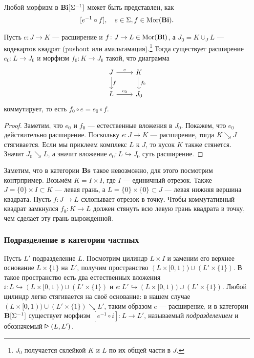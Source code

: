 \documentclass[10pt, twoside]{article}
\begin{document}
\begin{proposition}
    Любой морфизм в $\mathbf{Bi}[\Sigma^{-1}]$ может быть представлен, как $$[e^{-1}\circ f], \quad e \in \Sigma, f \in \operatorname{Mor}(\mathbf{Bi}).$$
\end{proposition}

\begin{lemma}
    Пусть $e \colon J \to K$ --- расширение и $f \colon J \to L \in \operatorname{Mor}(\mathbf{Bi})$, а $J_0 = K \cup_{J} L$ --- кодекартов квадрат (pushout или амальгамация).\footnote{$J_0$ получается склейкой $K$ и $L$ по их общей части в $J$.} Тогда существует расширение $e_0 \colon L \to J_0$ и морфизм $f_0 \colon K \to J_0$ такой, что диаграмма
    \begin{equation}
        \begin{tikzcd}
            J \rar["e"] \dar["f"] & K \dar["f_0"] \\
            L \rar["e_0"] & J_0
        \end{tikzcd}
    \end{equation}
    коммутирует, то есть $f_0 \circ e = e_0 \circ f.$
\end{lemma}
\begin{proof}
    Заметим, что $e_0$ и $f_0$ --- естественные вложения в $J_0$. Покажем, что $e_0$ действительно расширение. Поскольку $e\colon J \to K$ --- расширение, тогда $K \searrow J$ стягивается. Если мы приклеем комплекс $L$ к $J$, то  кусок $K$ также стянется. Значит $J_0 \searrow L$, а значит вложение $e_0 \colon L \hookrightarrow J_0$ суть расширение.
\end{proof}
Заметим, что в категории $\mathbf{Bs}$ такое невозможно, для этого посмотрим контрпример. Возьмём $K = I \times I$, где $I$ --- единичный отрезок. Также $J = \{0\} \times I \subset K$ --- левая грань, а $L = \{0\} \times \{0\} \subset J$ --- левая нижняя вершина квадрата. Пусть $f \colon J \to L$ схлопывает отрезок в точку. Чтобы коммутативный квадрат замкнулся $f_0 \colon K \to L$ должен стянуть всю левую грань квадрата в точку, чем сделает эту грань вырожденной.

\subsubsection{Подразделение в категории частных}
Пусть $L'$ подразделение $L$. Посмотрим цилиндр $L \times I$ и заменим его верхнее основание $L \times \{1\}$ на $L'$, получим пространство $(L\times [0, 1)) \cup (L' \times \{1\})$. В такое пространство есть два естественных вложения $i \colon L \hookrightarrow (L\times [0, 1)) \cup (L' \times \{1\})$ и $e \colon L' \hookrightarrow (L\times [0, 1)) \cup (L' \times \{1\})$. Любой цилиндр легко стягивается на своё основание: в нашем случае $(L\times [0, 1)) \cup (L' \times \{1\}) \searrow L'$, таким образом $e$ --- расширение, и в категории $\mathbf{B}[\Sigma^{-1}]$ существует морфизм $[e^{-1} \circ i] \colon L \to L'$, называемый \emph{подразделением} и обозначемый $\bigtriangleright(L, L')$.
\end{document}
